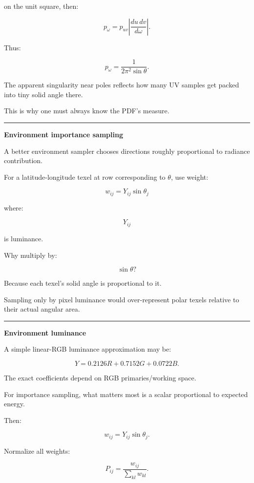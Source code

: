 on the unit square, then:

\[
p_\omega
=
p_{uv}
\left|
\frac{
du\,dv
}{
d\omega
}
\right|.
\]

Thus:

\[
\boxed{
p_\omega
=
\frac{
1
}{
2\pi^2\sin\theta
}.
}
\]

The apparent singularity near poles reflects how many UV samples get packed into tiny solid angle there.

This is why one must always know the PDF's measure.

\begin{center}\rule{0.5\linewidth}{0.5pt}\end{center}

\textbf{Environment importance sampling}

A better environment sampler chooses directions roughly proportional to radiance contribution.

For a latitude-longitude texel at row corresponding to \(\theta\), use weight:

\[
\boxed{
w_{ij}
=
Y_{ij}
\sin\theta_j
}
\]

where:

\[
Y_{ij}
\]

is luminance.

Why multiply by:

\[
\sin\theta?
\]

Because each texel's solid angle is proportional to it.

Sampling only by pixel luminance would over-represent polar texels relative to their actual angular area.

\begin{center}\rule{0.5\linewidth}{0.5pt}\end{center}

\textbf{Environment luminance}

A simple linear-RGB luminance approximation may be:

\[
Y
=
0.2126R+
0.7152G+
0.0722B.
\]

The exact coefficients depend on RGB primaries/working space.

For importance sampling, what matters most is a scalar proportional to expected energy.

Then:

\[
w_{ij}
=
Y_{ij}\sin\theta_j.
\]

Normalize all weights:

\[
P_{ij}
=
\frac{
w_{ij}
}{
\sum_{kl}w_{kl}
}.
\]

